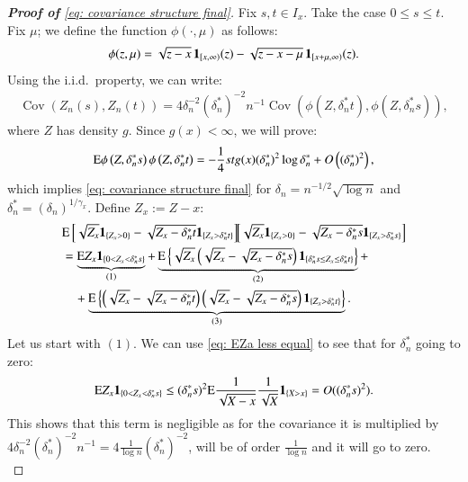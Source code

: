 \begin{proof}[\hypertarget{proof of lemma 1}{\textbf{Proof of}} \eqref{eq: covariance structure final}]
Fix $s, t \in I_x$. Take the case $0 \leq s \leq t$. Fix $\mu$; we define the function $\phi(\cdot, \mu)$ as follows:
$$
\phi(z, \mu)=\sqrt{z-x} \, \mathbf{1}_{[x, \infty)}(z)-\sqrt{z-x-\mu} \, \mathbf{1}_{[x+\mu, \infty)}(z) .
$$
Using the i.i.d.\ property, we can write:
\begin{align}\label{eq: equation covariance}
\operatorname{Cov}\left(Z_n(s), Z_n(t)\right)= 4 \delta_n^{-2} ( \delta^*_n)^{-2}  n^{-1} \operatorname{Cov}\left(\phi\left(Z, \delta^*_n t\right), \phi\left(Z, \delta^*_n s\right)\right),
\end{align}
where $Z$ has density $g$. 
Since $g(x) < \infty$, we will prove:
\begin{align}\label{eq: covariance phi function new}
\mathrm{E}  \phi\left(Z, \delta^*_n s\right) \phi\left(Z, \delta^*_n t\right)=- \frac{1}{4}st g(x) (\delta^*_n)^2 \log{\delta^*_n} +O\left((\delta^*_n)^2 \right),
\end{align}
which implies \eqref{eq: covariance structure final} for $\delta_n=n^{-1 / 2} \sqrt{\log n}$ and $\delta^*_n = (\delta_n)^{1/\gamma_x}$. Define $Z_x := Z-x$:
\begin{align*}
    &\ex \left[ \sqrt{Z_x} \ind_{\{Z_x > 0 \}} - \sqrt{Z_x - \delta^*_n t} \ind_{\{Z_x > \delta^*_n t \}} \right] \hspace{-0.1cm} \left[ \sqrt{Z_x} \ind_{\{Z_x > 0 \}} - \sqrt{Z_x - \delta^*_n s} \ind_{\{Z_x > \delta^*_n s \}} \right]\\
    &= \underbrace{\ex  Z_x \ind_{\{ 0 < Z_x < \delta^*_n s\}}}_{(1)} + \underbrace{\ex  \left\{ \sqrt{Z_x} \left(\sqrt{Z_x} - \sqrt{Z_x - \delta^*_n s} \right) \ind_{\{ \delta^*_n s \leq Z_x \leq \delta^*_n t\}}\right\}}_{(2)} + \\
    &\quad + \underbrace{\ex \left\{\left( \sqrt{Z_x} - \sqrt{Z_x - \delta^*_n t} \right) \left( \sqrt{Z_x} - \sqrt{Z_x - \delta^*_n s} \right) \ind_{\{Z_x >  \delta^*_n t \}} \right\}}_{(3)}.
\end{align*}
Let us start with $(1)$. We can use \eqref{eq: EZa less equal} to see that for $\delta^*_n$ going to zero: 
\begin{align*}
    \mathrm{E}  Z_x \mathbf{1}_{\{0 < Z_x < \delta^*_n s \}} \leq (\delta^*_n s)^2 \mathrm{E}  \frac{1}{\sqrt{X-x}} \frac{1}{\sqrt{X}} \mathbf{1}_{\{ X > x\}} = O((\delta^*_n s)^2).
\end{align*}
This shows that this term is negligible as for the covariance it is multiplied by $4 \delta_n^{-2} ( \delta^*_n)^{-2}  n^{-1} = 4 \frac{1}{\log{n}} ( \delta^*_n)^{-2}$, will be of order $\frac{1}{\log{n}}$ and it will go to zero. \\

\end{proof}
